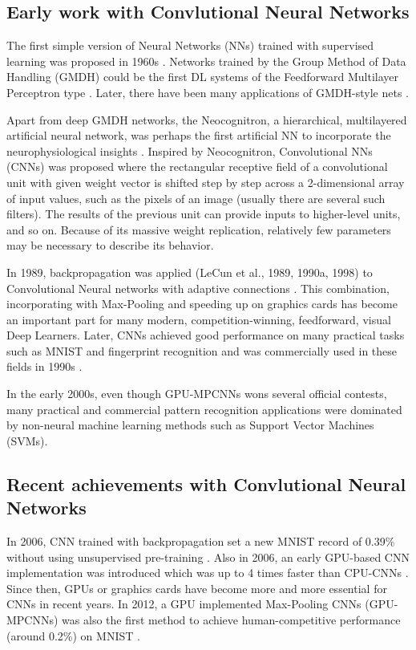 \subsection{Early work with Convlutional Neural Networks}
The first simple version of Neural Networks (NNs) trained with supervised learning was proposed in 1960s  \cite{rosenblatt1958perceptron}\cite{rosenblatt1962principles}. Networks trained by the Group Method of Data Handling (GMDH) could be the first DL systems of the Feedforward Multilayer Perceptron type \cite{ivakhnenko1965cybernetic}\cite{Schmidhuber14}. Later, there have been many applications of GMDH-style
nets \cite{farlow1984self} \cite{ikeda1976sequential} \cite{kondo2008multi} \cite{witczak2006gmdh}.

Apart from deep GMDH networks, the Neocognitron, a hierarchical, multilayered artificial neural network, was perhaps the first artificial NN to incorporate the
neurophysiological insights \cite{fukushima1980neocognitron}. Inspired by Neocognitron, Convolutional NNs (CNNs) was proposed where the rectangular receptive field of a convolutional unit with given weight vector is shifted step by step across a 2-dimensional array of input values, such as the pixels of an image (usually there are several such filters). The results of the previous unit can provide inputs to higher-level units, and so on. Because of its massive weight replication,  relatively few parameters may be necessary to describe its behavior.

In 1989, backpropagation was applied (LeCun et al., 1989, 1990a, 1998) to Convolutional Neural networks with adaptive connections \cite{lecun1989backpropagation}. This combination, incorporating with Max-Pooling and speeding up on graphics cards has become an important part for  many modern, competition-winning, feedforward, visual Deep Learners. Later, CNNs achieved good performance on many practical tasks such as MNIST and fingerprint recognition and was commercially used in these fields in 1990s \cite{baldi1993neural} \cite{le1990handwritten}. 

In the early 2000s, even though GPU-MPCNNs wons several official contests, many practical and commercial pattern recognition applications were dominated by non-neural machine learning methods such as Support Vector Machines (SVMs).

\subsection{Recent achievements with Convlutional Neural Networks}
In 2006, CNN trained with backpropagation set a new MNIST record of 0.39\% without using unsupervised pre-training \cite{marc2006efficient}. Also in 2006, an early GPU-based CNN implementation was introduced which was up to 4 times faster than CPU-CNNs \cite{chellapilla2006high}. Since then, GPUs or graphics cards have become more and more essential for CNNs in recent years. In 2012, a GPU implemented Max-Pooling CNNs (GPU-MPCNNs) was also the first method to achieve human-competitive performance (around 0.2\%) on MNIST \cite{ciresan2012multi}.

